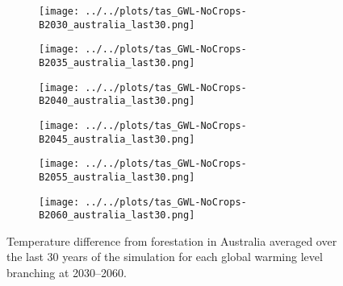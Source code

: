 \documentclass[]{article}
\begin{document}
\begin{figure}[H]
    \centering
    \begin{subfigure}[b]{0.4\linewidth}
        \texttt{[image: ../../plots/tas\_GWL-NoCrops-B2030\_australia\_last30.png]}
    \end{subfigure}
    \begin{subfigure}[b]{0.4\linewidth}
        \texttt{[image: ../../plots/tas\_GWL-NoCrops-B2035\_australia\_last30.png]}
    \end{subfigure}
    \begin{subfigure}[b]{0.4\linewidth}
        \texttt{[image: ../../plots/tas\_GWL-NoCrops-B2040\_australia\_last30.png]}
    \end{subfigure}
    \begin{subfigure}[b]{0.4\linewidth}
        \texttt{[image: ../../plots/tas\_GWL-NoCrops-B2045\_australia\_last30.png]}
    \end{subfigure}
    \begin{subfigure}[b]{0.4\linewidth}
        \texttt{[image: ../../plots/tas\_GWL-NoCrops-B2055\_australia\_last30.png]}
    \end{subfigure}
    \begin{subfigure}[b]{0.4\linewidth}
        \texttt{[image: ../../plots/tas\_GWL-NoCrops-B2060\_australia\_last30.png]}
    \end{subfigure}
    \caption{Temperature difference from forestation in Australia averaged over the last 30 years of the simulation for each global warming level branching at 2030–2060.
    }
    \label{fig:tas_australia}
\end{figure}
\end{document}
